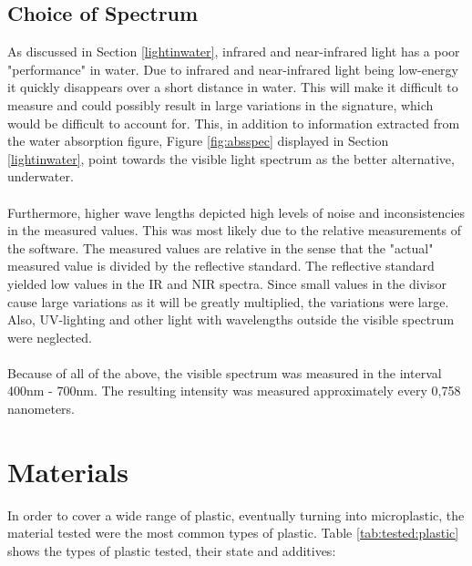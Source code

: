 \subsection{Choice of Spectrum}
As discussed in Section \ref{lightinwater}, infrared and near-infrared light has a poor "performance" in water. Due to infrared and near-infrared light being low-energy it quickly disappears over a short distance in water. This will make it difficult to measure and could possibly result in large variations in the signature, which would be difficult to account for. This, in addition to information extracted from the water absorption figure, Figure \ref{fig:absspec} displayed in Section \ref{lightinwater}, point towards the visible light spectrum as the better alternative, underwater.
\\\\
Furthermore, higher wave lengths depicted high levels of noise and inconsistencies in the measured values. This was most likely due to the relative measurements of the software. The measured values are relative in the sense that the "actual" measured value is divided by the reflective standard. The reflective standard yielded low values in the IR and NIR spectra. Since small values in the divisor cause large variations as it will be greatly multiplied, the variations were large. Also, UV-lighting and other light with wavelengths outside the visible spectrum were neglected.
\\\\
Because of all of the above, the visible spectrum was measured in the interval 400nm - 700nm. The resulting intensity was measured approximately every 0,758 nanometers. 

\section{Materials} \label{sec:material}
In order to cover a wide range of plastic, eventually turning into microplastic, the material tested were the most common types of plastic. Table \ref{tab:tested:plastic} shows the types of plastic tested, their state and additives:

